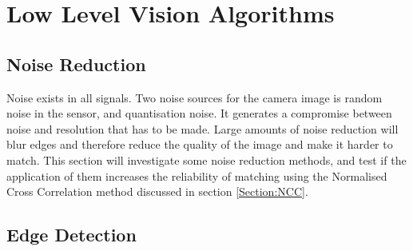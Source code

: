 \section{Low Level Vision Algorithms}
\subsection{Noise Reduction}
Noise exists in all signals. Two noise sources for the camera image is random noise in the sensor, and quantisation noise. It generates a compromise between noise and resolution that has to be made. Large amounts of noise reduction will blur edges and therefore reduce the quality of the image and make it harder to match. This section will investigate some noise reduction methods, and test if the application of them increases the reliability of matching using the Normalised Cross Correlation method discussed in section \ref{Section:NCC}. 
\subsection{Edge Detection}
